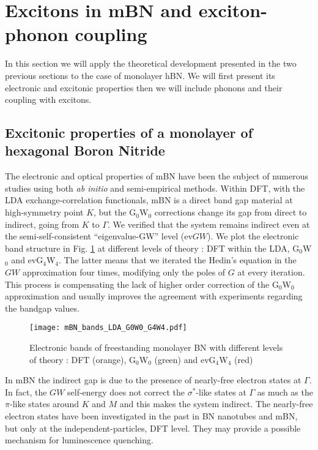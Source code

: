 \section{Excitons in mBN and exciton-phonon coupling}
In this section we will apply the theoretical development presented in the two previous sections to the case of monolayer hBN. We will first present its electronic and excitonic properties then we will include phonons and their coupling with excitons.
%
\subsection{Excitonic properties of a monolayer of hexagonal Boron Nitride}
The electronic and optical properties of \acrlong{mBN} have been the subject of numerous studies using both \emph{ab initio} and semi-empirical methods.\cite{galvani2016excitons}
Within DFT, with the LDA exchange-correlation functionals, \acrshort{mBN} is a direct band gap material at high-symmetry point $K$, but the G$_0$W$_0$ corrections change its gap from direct to indirect, going from $K$ to $\Gamma$.\cite{prete2020giant} 
We verified that the system remains indirect even at the semi-self-consistent ``eigenvalue-GW'' level (ev$GW$). We plot the electronic band structure in Fig. \ref{fig:mBN_bands_LDA_G0W0_G4W4} at different levels of theory : \acrshort{DFT} within the \acrshort{LDA}, G$_0$W$_0$ and evG$_4$W$_4$. The latter means that we iterated the Hedin's equation in the $GW$ approximation four times, modifying only the poles of $G$ at every iteration.\cite{van2006quasiparticle} This process is compensating the lack of higher order correction of the G$_0$W$_0$ approximation and usually improves the agreement with experiments regarding the bandgap values.\cite{faber2014excited}
\begin{figure}[h!b]
	\vspace{0.2cm}
	\setcapindent{2em}
	\centering
	\texttt{[image: mBN\_bands\_LDA\_G0W0\_G4W4.pdf]}
	\caption{Electronic bands of freestanding monolayer BN with different levels of theory : DFT (orange), G$_ 0$W$_0$ (green) and evG$_4$W$_4$ (red)} %
	\label{fig:mBN_bands_LDA_G0W0_G4W4}
\end{figure}
In \acrshort{mBN} the indirect gap is due to the presence of nearly-free electron states at $\Gamma$. 
In fact, the $GW$ self-energy does not correct the $\sigma^*$-like states at $\Gamma$ as much as the $\pi$-like states around $K$ and $M$ and this makes the system indirect.
The nearly-free electron states have been investigated in the past in BN nanotubes and mBN,\cite{blase1994stability,Blase1995monolayer} but only at the independent-particles, \acrshort{DFT} level. They may provide a possible mechanism for luminescence quenching.\cite{schue2016dimensionality}

